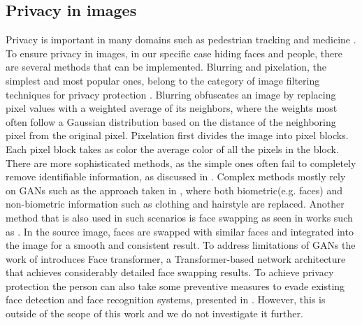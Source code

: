 \subsection{Privacy in images}
Privacy is important in many domains such as pedestrian tracking \cite{Kunchala_Bouroche_Schoen-Phelan_2023,Zhao_Zhang_Demiris_2024,Ohno_Ukyo_Amano_Rizk_Yamaguchi_2023} and medicine \cite{Yang_Lyu_Wang_Wen_Zhao_Chen_Bi_Meng_Mao_Xiao_2022}.
To ensure privacy in images, in our specific case hiding faces and people, there are several methods that can be implemented.
Blurring and pixelation, the simplest and most popular ones, belong to the category of image filtering techniques for privacy protection \cite{Padilla-López_Chaaraoui_Flórez-Revuelta_2015}.
Blurring obfuscates an image by replacing pixel values with a weighted average of its neighbors, where the weights most often follow a Gaussian distribution based on the distance of the neighboring pixel from the original pixel.
Pixelation first divides the image into pixel blocks. Each pixel block takes as color the average color of all the pixels in the block.
There are more sophisticated methods, as the simple ones often fail to completely remove identifiable information, as discussed in \cite{Reid_Samangooei_Chen_Nixon_Ross_2013}.
Complex methods mostly rely on \ac{GAN}s such as the approach taken in \cite{Brkic_Sikiric_Hrkac_Kalafatic_2017}, where both biometric(e.g. faces) and non-biometric information such as clothing and hairstyle are replaced.
Another method that is also used in such scenarios is face swapping as seen in works such as \cite{Zhao_Zhang_Demiris_2024,Li_Ma_Yan_Zhu_Yang_2023,Yoo_Choi_Choi_Kim_2023}. In the source image, faces are swapped with similar faces and integrated into the image for a smooth and consistent result.
To address limitations of \ac{GAN}s the work of \cite{Cui_Wu_Zhan_Lu_2023} introduces Face transformer, a Transformer-based network architecture that achieves considerably detailed face swapping results.
To achieve privacy protection the person can also take some preventive measures to evade existing face detection and face recognition systems, presented in \cite{Hasan_Guest_Deravi_2023}. However, this is outside of the scope of this work and we do not investigate it further.


